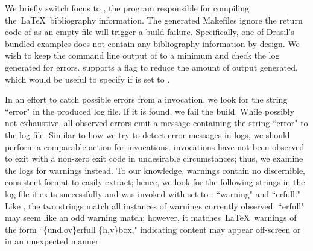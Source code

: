 {{{{{%
%
%
%
%

We briefly switch focus to , the program responsible for compiling the\ \LaTeX\ bibliography information. The generated Makefiles ignore the return code of  as an empty file will trigger a build failure. Specifically, one of Drasil's bundled examples does not contain any bibliography information by design. We wish to keep the command line output of  to a minimum and check the log generated for errors.  supports a  flag to reduce the amount of output generated, which would be useful to specify if  is set to . 

In an effort to catch possible errors from a  invocation, we look for the string ``error" in the produced log file. If it is found, we fail the build. While possibly not exhaustive, all observed  errors emit a message containing the string ``error" to the log file. Similar to how we try to detect error messages in  logs, we should perform a comparable action for  invocations.  invocations have not been observed to exit with a non-zero exit code in undesirable circumstances; thus, we examine the  logs for warnings instead. To our knowledge,  warnings contain no discernible, consistent format to easily extract; hence, we look for the following strings in the log file if  exits successfully and was invoked with  set to : ``warning" and ``erfull." Like , the two strings match all instances of warnings currently observed. ``erfull" may seem like an odd warning match; however, it matches\ \LaTeX\ warnings of the form ``\{und,ov\}erfull \{h,v\}box," indicating content may appear off-screen or in an unexpected manner.

}}}}}
